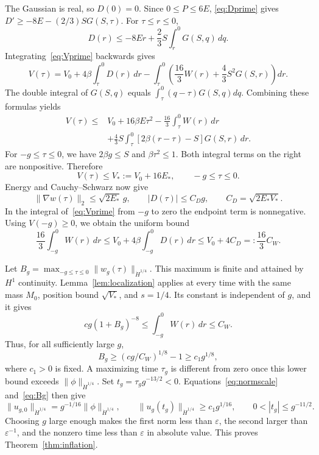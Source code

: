 \documentclass[11pt]{article}
\numberwithin{equation}{section}
\begin{document}
The Gaussian is real, so $D(0)=0$. Since $0\le P\le6E$,
\eqref{eq:Dprime} gives $D'\ge-8E-(2/3)SG(S,\tau)$. For $\tau\le r\le0$,
\[
 D(r)\le-8Er+\frac23S\int_r^0G(S,q)\,dq.
\]
Integrating~\eqref{eq:Vprime} backwards gives
\[
 V(\tau)=V_0+4\beta\int_\tau^0D(r)\,dr
 -\int_\tau^0\left(\frac{16}{3}W(r)+\frac43S^2G(S,r)\right)dr.
\]
The double integral of $G(S,q)$ equals $\int_\tau^0(q-\tau)G(S,q)dq$.
Combining these formulas yields
\begin{align}\label{eq:backward}
 V(\tau)\le {}&V_0+16\beta E\tau^2-\frac{16}{3}\int_\tau^0W(r)\,dr\nonumber\\
 &+\frac43S\int_\tau^0[2\beta(r-\tau)-S]G(S,r)\,dr.
\end{align}
For $-g\le\tau\le0$, we have $2\beta g\le S$ and $\beta\tau^2\le1$.
Both integral terms on the right are nonpositive. Therefore
\begin{equation}\label{eq:Vstar}
 V(\tau)\le V_*:=V_0+16E_*,\qquad -g\le\tau\le0.
\end{equation}
Energy and Cauchy--Schwarz now give
\[
 \|\nabla w(\tau)\|_2\le\sqrt{2E_*}\,g,
 \qquad |D(\tau)|\le C_Dg,\qquad C_D=\sqrt{2E_*V_*}.
\]
In the integral of~\eqref{eq:Vprime} from $-g$ to zero the endpoint
term is nonnegative. Using $V(-g)\ge0$, we obtain the uniform bound
\begin{equation}\label{eq:Wupper}
 \frac{16}{3}\int_{-g}^0W(r)\,dr
 \le V_0+4\beta\int_{-g}^0D(r)\,dr
 \le V_0+4C_D=:\frac{16}{3}C_W.
\end{equation}

Let $B_g=\max_{-g\le\tau\le0}\|w_g(\tau)\|_{\dot H^{1/4}}$.
This maximum is finite and attained by $H^1$ continuity. Lemma~\ref{lem:localization}
applies at every time with the same mass $M_0$, position bound $\sqrt{V_*}$,
and $s=1/4$. Its constant is independent of $g$, and it gives
\[
 cg(1+B_g)^{-8}\le\int_{-g}^0W(r)\,dr\le C_W.
\]
Thus, for all sufficiently large $g$,
\begin{equation}\label{eq:Bg}
 B_g\ge(cg/C_W)^{1/8}-1\ge c_1g^{1/8},
\end{equation}
where $c_1>0$ is fixed. A maximizing time $\tau_g$ is different from zero
once this lower bound exceeds $\|\phi\|_{\dot H^{1/4}}$. Set
$t_g=\tau_g g^{-13/2}<0$. Equations~\eqref{eq:normscale} and~\eqref{eq:Bg}
then give
\[
 \|u_{g,0}\|_{\dot H^{1/4}}=g^{-1/16}\|\phi\|_{\dot H^{1/4}},
 \qquad\|u_g(t_g)\|_{\dot H^{1/4}}\ge c_1g^{1/16},
 \qquad 0<|t_g|\le g^{-11/2}.
\]
Choosing $g$ large enough makes the first norm less than $\varepsilon$, the
second larger than $\varepsilon^{-1}$, and the nonzero time less than
$\varepsilon$ in absolute value. This proves Theorem~\ref{thm:inflation}.
\end{document}
